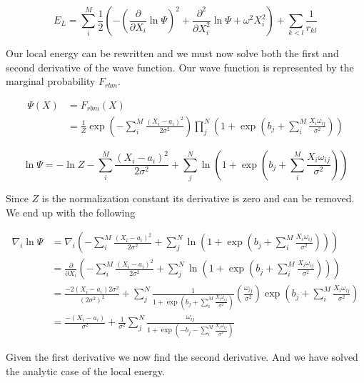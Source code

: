 \begin{equation*}
E_L = \sum_{i}^{M} \frac{1}{2} \left( - \left( \frac{\partial}{\partial X_{i}} \ln \Psi \right)^2 + \frac{\partial^2}{\partial X_{i}^2} \ln \Psi  + \omega^2 X_i^2 \right) +  \sum_{k < l} \frac{1}{r_{kl}}
\end{equation*}

Our local energy can be rewritten and we must now solve both the first and second derivative of the wave function. Our wave function is represented by the marginal probability $F_{rbm}$.

\begin{align*}
\Psi(X) &= F_{rbm}(X) \\
&= \frac{1}{Z} \exp \left( -\sum_{i}^{M} \frac{(X_i - a_i)^2}{2 \sigma^2} \right) \prod_{j}^{N} \left( 1 + \exp \left( b_j + \sum_{i}^{M} \frac{X_i \omega_{ij}}{\sigma^2} \right) \right)
\end{align*}


\begin{equation*}
\ln \Psi = -\ln Z - \sum_{i}^{M} \frac{(X_i - a_i)^2}{2 \sigma^2} +  \sum_{j}^{N} \ln \left(1 + \exp \left( b_j + \sum_{i}^{M} \frac{X_i \omega_{ij}}{\sigma^2} \right) \right)
\end{equation*}

Since $Z$ is the normalization constant its derivative is zero and can be removed.
We end up with the following

\begin{align*}
\nabla_i \ln \Psi &= \nabla_i \left( - \sum_{i}^{M} \frac{(X_i - a_i)^2}{2 \sigma^2} +  \sum_{j}^{N} \ln \left( 1 + \exp \left( b_j + \sum_{i}^{M} \frac{X_i \omega_{ij}}{\sigma^2} \right) \right) \right) \\
&= \frac{\partial}{\partial X_i} \left( - \sum_{i}^{M} \frac{(X_i - a_i)^2}{2 \sigma^2} +  \sum_{j}^{N} \ln \left(1 + \exp \left( b_j + \sum_{i}^{M} \frac{X_i \omega_{ij}}{\sigma^2} \right) \right) \right)\\
&= \frac{-2 (X_i - a_i) 2 \sigma^2}{(2 \sigma^2)^2} + \sum_{j}^{N} \frac{1}{1 + \exp \left( b_j + \sum_{i}^{M} \frac{X_i \omega_{ij}}{\sigma^2} \right)} \left( \frac{\omega_{ij}}{\sigma^2} \right) \exp \left(  b_j + \sum_{i}^{M} \frac{X_i \omega_{ij}}{\sigma^2} \right) \\
&= \frac{-(X_i - a_i)}{\sigma^2} + \frac{1}{\sigma^2}\sum_{j}^{N} \frac{\omega_{ij}}{1 + \exp \left( -b_j - \sum_{i}^{M} \frac{X_i \omega_{ij}}{\sigma^2} \right)}
\end{align*}

Given the first derivative we now find the second derivative. And we have solved the analytic case of the local energy.

